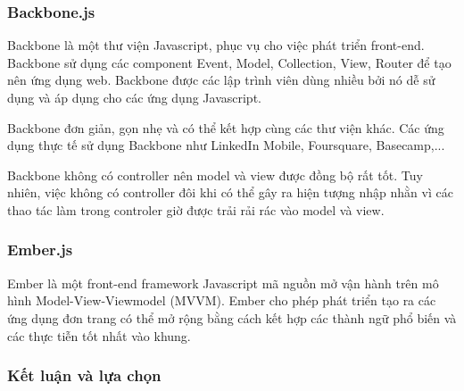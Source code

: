 \subsubsection{Backbone.js}
Backbone là một thư viện Javascript, phục vụ cho việc phát triển front-end. Backbone sử dụng các component Event, Model, Collection, View, Router để tạo nên ứng dụng web. Backbone được các lập trình viên dùng nhiều bởi nó dễ sử dụng và áp dụng cho các ứng dụng Javascript.

Backbone đơn giản, gọn nhẹ và có thể kết hợp cùng các thư viện khác. Các ứng dụng thực tế sử dụng Backbone như LinkedIn Mobile, Foursquare, Basecamp,...

Backbone không có controller nên model và view được đồng bộ rất tốt. Tuy nhiên, việc không có controller đôi khi có thể gây ra hiện tượng nhập nhằn vì các thao tác làm trong controler giờ được trải rải rác vào model và view.
\subsubsection{Ember.js}
Ember là một front-end framework Javascript mã nguồn mở vận hành trên mô hình Model-View-Viewmodel (MVVM). Ember cho phép phát triển tạo ra các ứng dụng đơn trang có thể mở rộng bằng cách kết hợp các thành ngữ phổ biến và các thực tiễn tốt nhất vào khung.
\subsubsection{Kết luận và lựa chọn}

